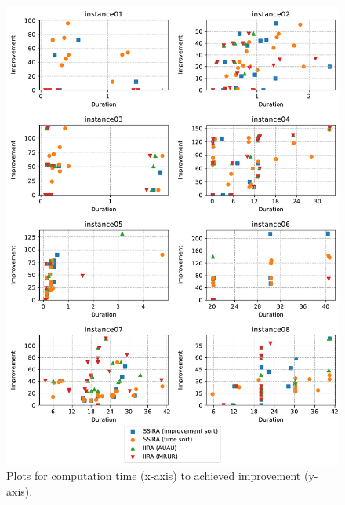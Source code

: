 \begin{figure}[t]
    \centering
    \includegraphics[width=\textwidth]{img/exp_aggregated_duration_improv.pdf}
    \caption{
        Plots for computation time (x-axis) to achieved improvement (y-axis).
        }
    \label{fig:exp/duration-improv}
\end{figure}

